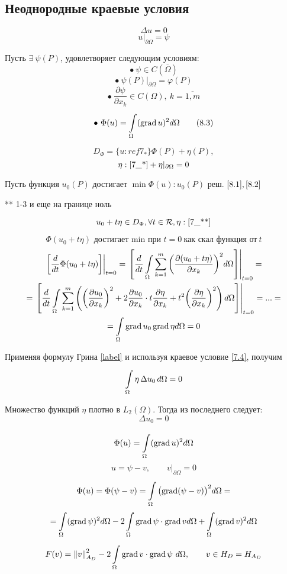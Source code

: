 \subsection{Неоднородные краевые условия}

\[ \Delta u = 0 \label{8.1} \tag{8.1} \]
\[ u|_{\partial \Omega} = \psi \label{8.2} \tag{8.2} \]

Пусть $\exists \ \psi(P)$, удовлетворяет следующим условиям:
\[ \bullet \ \psi \in C(\overline{\Omega}) \]
\[ \bullet \ {\left. \psi (P) \right|}_{\partial \Omega} = \varphi(P) \]
\[ \bullet \ \frac{\partial  \psi}{\partial  x_k} \in C(\Omega), \ k=\overline{1,m} \]
\[ \bullet \ \Phi(u) = \int\limits_{\Omega}^{} (\operatorname{grad} u)^2 d\Omega \label{8.3} \tag{8.3} \]

\[ D_{\Phi} = \{u: ref{7_*} \} \Phi (P) + \eta(P), \]
\[ \eta: \ref{7_*} + \eta|_{\partial  \Omega } = 0 \label{7_4} \]

Пусть функция $ u_0(P) $ достигает $ \min \Phi(u) : u_0(P) $ реш. $ \eqref{8.1}, \eqref{8.2} $

** 1-3 и еще на границе ноль $ \label{7_**}$

\[ u_0 + t \eta \in D_{\Phi}, \forall t \in \mathcal{R}, \eta : \ref{7_**} \]

\[ \Phi(u_0 + t \eta)\textrm{ достигает min при  } t=0 \ \text{как скал функция от} \ t \]
\begin{multline*}
	{\left. \left[ \frac{d}{dt} \Phi(u_0+t \eta) \right] \right|}_{t=0} = {\left. \left[ \frac{d}{dt} \int\limits_{\Omega}^{} \sum\limits_{k=1}^{m} {\left(\frac{\partial (u_0 + t\eta)}{\partial x_k}\right)}^2 d\Omega \right] \right|}_{t=0} = \\
	= {\left. \left[ \frac{d}{dt} \int\limits_{\Omega}^{} \sum\limits_{k=1}^{m} \left({\left(\frac{\partial u_0}{\partial  x_k}\right)}^2 + 2\frac{\partial u_0}{\partial x_k} \cdot t \frac{\partial \eta}{\partial x_k} + t^2 {\left(\frac{\partial \eta}{\partial x_k}\right)}^2 \right) d\Omega \right] \right|}_{t=0} = ... = \\
	= \int\limits_{\Omega} \operatorname{grad} u_0 \operatorname{grad} \eta d\Omega = 0
\end{multline*}

Применяя формулу Грина \eqref{label} и используя краевое условие \eqref{7.4}, получим
\[ \int\limits_{\Omega}^{} \eta \, \Delta u_0 \, d\Omega = 0 \]

Множество функций $\eta$ плотно в $L_2(\Omega)$. Тогда из последнего следует:
\[ \Delta u_0 = 0 \]

\[ \Phi (u) = \int\limits_{\Omega}^{}(\operatorname{grad} u)^2 d \Omega \]
\[ u = \psi - v, \qquad v|_{\partial \Omega} = 0 \]
\begin{multline*}
	\Phi(u) = \Phi (\psi - v) = \int\limits_{\Omega}^{} {\bigl(\operatorname{grad} (\psi - v) \bigr)}^2 d\Omega = \\
	= \int\limits_{\Omega}^{} (\operatorname{grad} \psi)^2 d\Omega - 2 \int\limits_{\Omega}^{} \operatorname{grad} \psi \cdot \operatorname{grad} v d \Omega + \int\limits_{\Omega}^{} (\operatorname{grad} v)^2 d \Omega
\end{multline*}
\[ F(v) = {\|v\|}^2_{A_D} - 2 \int\limits_{\Omega}^{} \operatorname{grad} v \cdot \operatorname{grad} \psi \ d\Omega, \qquad v \in H_D = H_{A_D}\]


